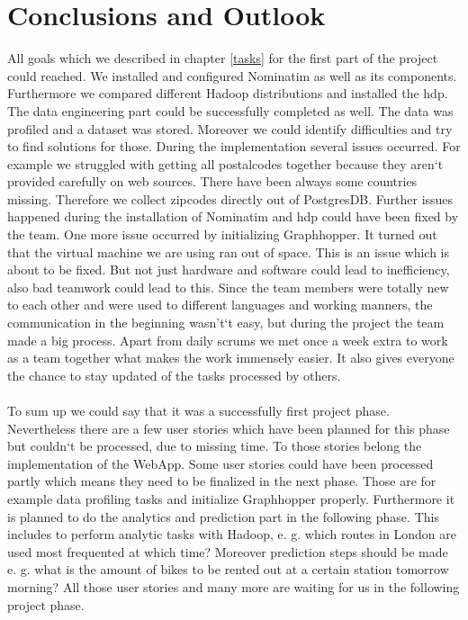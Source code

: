 \documentclass[12pt]{article}
\begin{document}
\section{Conclusions and Outlook}
All goals which we described in chapter \ref{tasks} for the first part of the project could reached. We installed and configured Nominatim as well as its components. Furthermore we compared different Hadoop distributions and installed the \acs{hdp}. The data engineering part could be successfully completed as well. The data was profiled and a dataset was stored. Moreover we could identify difficulties and try to find solutions for those. During the implementation several issues occurred. For example we struggled with getting all postalcodes together because they aren`t provided carefully on web sources. There have been always some countries missing. Therefore we collect zipcodes directly out of PostgresDB. Further issues happened during the installation of Nominatim and \acs{hdp} could have been fixed by the team. One more issue occurred by initializing Graphhopper. It turned out that the virtual machine we are using ran out of space. This is an issue which is about to be fixed. But not just hardware and software could lead to inefficiency, also bad teamwork could lead to this. Since the team members were totally new to each other and were used to different languages and working manners, the communication in the beginning wasn't`t easy, but during the project the team made a big process. Apart from daily scrums we met once a week extra to work as a team together what makes the work immensely easier. It also gives everyone the chance to stay updated of the tasks processed by others.\\\\ To sum up we could say that it was a successfully first project phase.\\Nevertheless there are a few user stories which have been planned for this phase but couldn`t be processed, due to missing time. To those stories belong the implementation of the WebApp. Some user stories could have been processed partly which means they need to be finalized in the next phase. Those are for example data profiling tasks and initialize Graphhopper properly. 
Furthermore it is planned to do the analytics and prediction part in the following phase. This includes to perform analytic tasks with Hadoop, e. g. which routes in London are used most frequented at which time?
Moreover prediction steps should be made e. g. what is the amount of bikes to be rented out at a certain station tomorrow morning?
All those user stories and many more are waiting for us in the following project phase.
\end{document}
